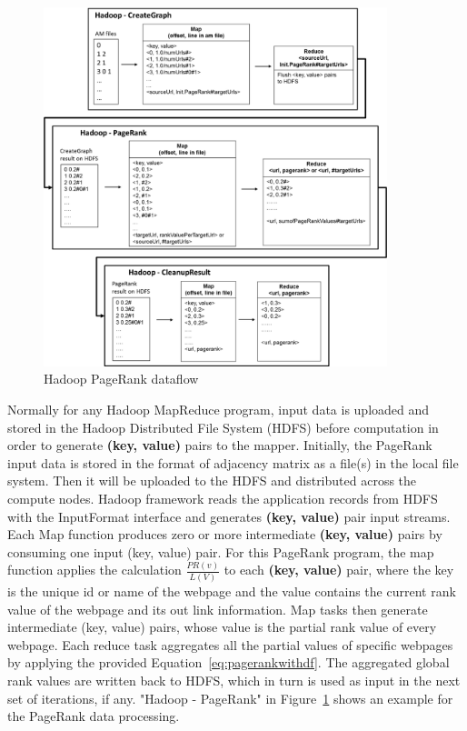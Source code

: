 \begin{figure}[!htbp]
\centering
\includegraphics[width=10cm]{section/icloud/assignment/problems/project2/hadoopdataflow.png}
\caption{Hadoop PageRank dataflow}
\label{fig:hadoopdataflow}
\end{figure}

Normally for any Hadoop MapReduce program, input data is uploaded and stored in
the Hadoop Distributed File System (HDFS) before computation in order to
generate \textbf{(key, value)} pairs to the mapper. Initially, the PageRank
input data is stored in the format of adjacency matrix as a file(s) in the
local file system. Then it will be uploaded to the HDFS and distributed across
the compute nodes. Hadoop framework reads the application records from HDFS
with the InputFormat interface and generates \textbf{(key, value)} pair input
streams. Each Map function produces zero or more intermediate \textbf{(key,
value)} pairs by consuming one input (key, value) pair. For this PageRank
program, the map function applies the calculation $\frac{PR(v)}{L(V)}$ to each
\textbf{(key, value)} pair, where the key is the unique id or name of the
webpage and the value contains the current rank value of the webpage and its
out link information. Map tasks then generate intermediate (key, value) pairs,
whose value is the partial rank value of every webpage. Each reduce task
aggregates all the partial values of specific webpages by applying the provided
Equation~\ref{eq:pagerankwithdf}. The aggregated global rank values are written
back to HDFS, which in turn is used as input in the next set of iterations, if
any. "Hadoop - PageRank" in Figure~\ref{fig:hadoopdataflow} shows an example
for the PageRank data processing.


